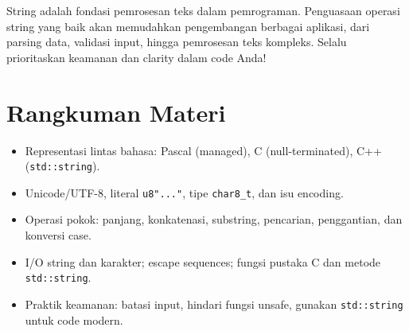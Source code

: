 \documentclass[../main.tex]{subfiles}
\begin{document}
String adalah fondasi pemrosesan teks dalam pemrograman. Penguasaan operasi string yang baik akan memudahkan pengembangan berbagai aplikasi, dari parsing data, validasi input, hingga pemrosesan teks kompleks. Selalu prioritaskan keamanan dan clarity dalam code Anda!

\section{Rangkuman Materi}
\begin{itemize}
  \item Representasi lintas bahasa: Pascal (managed), C (null-terminated), C++ (\texttt{std::string}).
  \item Unicode/UTF-8, literal \texttt{u8"..."}, tipe \texttt{char8\_t}, dan isu encoding.
  \item Operasi pokok: panjang, konkatenasi, substring, pencarian, penggantian, dan konversi case.
  \item I/O string dan karakter; escape sequences; fungsi pustaka C dan metode \texttt{std::string}.
  \item Praktik keamanan: batasi input, hindari fungsi unsafe, gunakan \texttt{std::string} untuk code modern.
\end{itemize}
\end{document}
